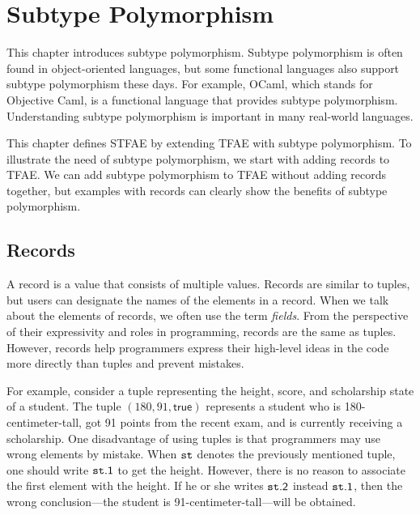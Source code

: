 \setchapterpreamble[u]{\margintoc}
\chapter{Subtype Polymorphism}

\renewcommand{\plang}{\textsf{TFAE}\xspace}
\renewcommand{\lang}{\textsf{STFAE}\xspace}

This chapter introduces subtype polymorphism. Subtype polymorphism is often
found in object-oriented languages, but some functional languages also support
subtype polymorphism these days. For example, OCaml, which stands for Objective
Caml, is a functional language that provides subtype polymorphism. Understanding
subtype polymorphism is important in many real-world languages.

This chapter
defines \lang by extending \plang with subtype polymorphism. To illustrate the
need of subtype polymorphism, we start with adding records to \plang. We can add
subtype polymorphism to \plang without adding records together, but examples with
records can clearly show the benefits of subtype polymorphism.

\section{Records}

A record is a value that consists of multiple values. Records are similar to tuples,
but users can designate the names of the elements in a record. When we talk
about the elements of records, we often use the term
\textit{fields}. From the perspective
of their expressivity and roles in programming, records are the same as tuples.
However, records help programmers express their high-level ideas in the code
more directly than tuples and prevent mistakes.

For example,
consider a tuple representing the height, score, and scholarship state of a
student. The tuple $(180,91, \textsf{true})$ represents a student who is
180-centimeter-tall, got 91 points from the recent exam, and is currently
receiving a scholarship. One disadvantage of using tuples is that programmers
may use wrong elements by mistake. When $\texttt{st}$ denotes the previously
mentioned tuple, one should write $\texttt{st}\textsf{.1}$ to get the height.
However, there is no reason to associate the first element with the height. If he or
she writes $\texttt{st}\textsf{.2}$ instead $\texttt{st}\textsf{.1}$, then the wrong
conclusion---the student is 91-centimeter-tall---will be obtained.

